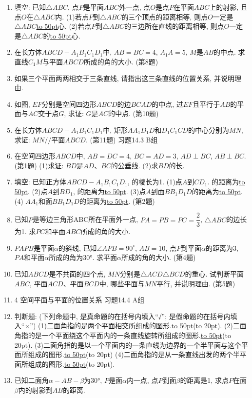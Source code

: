 \documentclass[10pt,a4paper]{article}
\newcommand{\blank}[1]{\underline{\hbox to #1pt{}}}
\newcommand{\bracket}[1]{(\hbox to #1pt{})}
\begin{document}
\begin{enumerate}[1.]
\item 填空:
已知$\triangle ABC$, 点$P$是平面$ABC$外一点, 点$O$是点$P$在平面$ABC$上的射影, 且点$O$在$\triangle ABC$内.
(1)若点$P$到$\triangle ABC$的三个顶点的距离相等, 则点$O$一定是$\triangle ABC$\blank{50}心.
(2)若点$P$到$\triangle ABC$的三边所在直线的距离相等, 则点$O$一定是$\triangle ABC$的\blank{50}心.
\item 在长方体$ABCD-A_1B_1C_1D_1$中, $AB=BC=4$, $A_1A=5$, $M$是$AB$的中点. 求直线$C_1M$与平面$ABCD$所成的角的大小.
(第8题)
\item 如果三个平面两两相交于三条直线, 请指出这三条直线的位置关系, 并说明理由.
\item 如图, $EF$分别是空间四边形$ABCD$的边$BCAD$的中点, 过$EF$且平行于$AB$的平面与$AC$交于点$G$, 求证: $G$是$AC$的中点.
(第10题)
\item 在长方体$ABCD-A_1B_1C_1D_1$中, 矩形$AA_1D_1D$和$D_1C_1CD$的中心分别为$MN$, 求证: $MN//$平面$ABCD$.
(第11题)
习题14.3 B组
\item 在空间四边形$ABCD$中, $AB=DC=4$, $BC=AD=3$, $AD\perp BC$, $AB\perp BC$.
(第1题)
(1)求证: $BD$是$AD$、$BC$的公垂线.
(2)求$BD$的长.
\item 填空:
已知正方体$ABCD-A_1B_1C_1D_1$, 的棱长为1.
(1)点$A$到$CD_1$. 的距离为\blank{50}.
(2)点$A$到$BD_1$, 的距离为\blank{50}.
(3)点$A$到面$BB_1D_1D$的距离为\blank{50}.
(4) $AA_1$和面$BB_1D_1D$的距离为\blank{50}.
(第2题)
\item 已知$P$是等边三角形ABC所在平面外一点, $PA=PB=PC=\dfrac 23$, $\triangle ABC$的边长为1. 求$PC$和平面$ABC$所成的角的大小.
\item $PAPB$是平面$\alpha$的斜线, 已知$\angle APB=90^\circ$, $AB=10$, 点$P$到平面$\alpha$的距离为3, $PA$和平面$\alpha$所成的角为30°. 求平面$\alpha$所成的角的大小.
(第4题)
\item 已知$ABCD$是不共面的四个点, $MN$分别是$\triangle ACD\triangle BCD$的重心. 试判断平面$ABC$, 平面$ACD$、平面$BCD$中, 哪些平面与$MN$平行, 并说明理由.
(第5题)
\item 4  空间平面与平面的位置关系
习题14.4 A组
\item 判断题: (下列命题中, 是真命题的在括号内填入``√''; 是假命题的在括号内填入``×'')
(1)二面角指的是两个平面相交所组成的图形.\blank{50}\bracket{20}.
(2)二面角指的是一个平面绕这个平面内的一条直线旋转所组成的图形.\blank{50}\bracket{20}.
(3)二面角指的是以一个平面内的一条直线为边界的一个半平面与这个平面所组成的图形.\blank{50}\bracket{20}
(4)二面角指的是从一条直线出发的两个半平面所组成的图形.\blank{50}\bracket{20}.
\item 已知二面角$\alpha -AB-\beta$为30°, $P$是面$\alpha$内一点, 点$P$到面$\beta$的距离是1, 求点$P$在面$\beta$内的射影到$AB$的距离.

\end{enumerate}
\end{document}
